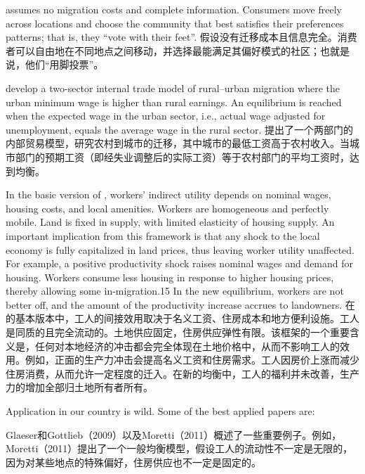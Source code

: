 \documentclass[a4paper,12pt,oneside]{book} %
\begin{document}
\cite{tieboutPureTheoryLocal1956} assumes no migration costs and complete information. Consumers move freely across locations and choose the community that best satisfies their preferences patterns; that is, they “vote with their feet”. 
\cite{tieboutPureTheoryLocal1956}假设没有迁移成本且信息完全。消费者可以自由地在不同地点之间移动，并选择最能满足其偏好模式的社区；也就是说，他们“用脚投票”。

\cite{harrisMigrationUnemploymentDevelopment1970} develop a two-sector internal trade model of rural–urban migration where the urban minimum wage is higher than rural earnings. An equilibrium is reached when the expected wage in the urban sector, i.e., actual wage adjusted for unemployment, equals the average wage in the rural sector.
\cite{harrisMigrationUnemploymentDevelopment1970}提出了一个两部门的内部贸易模型，研究农村到城市的迁移，其中城市的最低工资高于农村收入。当城市部门的预期工资（即经失业调整后的实际工资）等于农村部门的平均工资时，达到均衡。



In the basic version of \cite{robackWagesRentsQuality1982}, workers’  indirect utility depends on nominal wages, housing costs, and local amenities. Workers are  homogeneous and perfectly mobile. Land is fixed in supply, with limited elasticity of housing  supply. An important implication from this framework is that any shock to the local economy is fully capitalized in land prices, thus leaving worker utility unaffected. For example, a positive  productivity shock raises nominal wages and demand for housing. Workers consume less housing in  response to higher housing prices, thereby allowing some in-migration.15 In the new equilibrium,  workers are not better off, and the amount of the productivity increase accrues to landowners.
在\cite{robackWagesRentsQuality1982}的基本版本中，工人的间接效用取决于名义工资、住房成本和地方便利设施。工人是同质的且完全流动的。土地供应固定，住房供应弹性有限。该框架的一个重要含义是，任何对本地经济的冲击都会完全体现在土地价格中，从而不影响工人的效用。例如，正面的生产力冲击会提高名义工资和住房需求。工人因房价上涨而减少住房消费，从而允许一定程度的迁入。在新的均衡中，工人的福利并未改善，生产力的增加全部归土地所有者所有。

Application in our country is wild. Some of the best applied papers are:

Glaeser和Gottlieb（2009）以及Moretti（2011）概述了一些重要例子。例如，Moretti（2011）提出了一个一般均衡模型，假设工人的流动性不一定是无限的，因为对某些地点的特殊偏好，住房供应也不一定是固定的。
\end{document}
